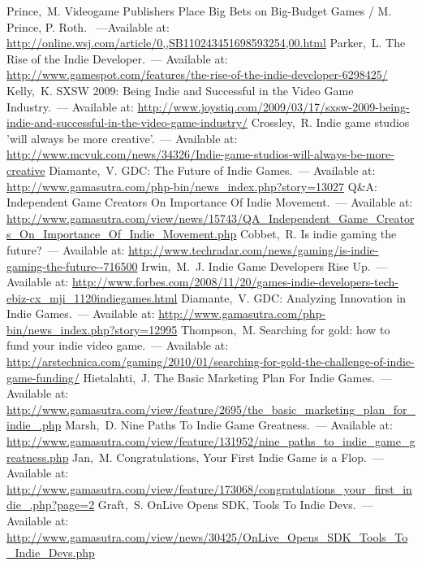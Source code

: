 \begin{thebibliography}{10}
     Prince,~M. Videogame Publishers Place Big Bets on Big-Budget Games / M. Prince, P. Roth.
        ~---Available at: \url{http://online.wsj.com/article/0,,SB110243451698593254,00.html}
     Parker,~L. The Rise of the Indie Developer.~--- Available at: 
        \url{http://www.gamespot.com/features/the-rise-of-the-indie-developer-6298425/}
     Kelly,~K. SXSW 2009: Being Indie and Successful in the Video Game Industry.~--- 
        Available at:
        \url{http://www.joystiq.com/2009/03/17/sxsw-2009-being-indie-and-successful-in-the-video-game-industry/}
     Crossley,~R. Indie game studios 'will always be more creative’.~--- Available at: 
        \url{http://www.mcvuk.com/news/34326/Indie-game-studios-will-always-be-more-creative}
     Diamante,~V. GDC: The Future of Indie Games.~--- Available at: 
        \url{http://www.gamasutra.com/php-bin/news_index.php?story=13027}
     Q\&A: Independent Game Creators On Importance Of Indie Movement.~--- Available at:
        \url{http://www.gamasutra.com/view/news/15743/QA_Independent_Game_Creators_On_Importance_Of_Indie_Movement.php}
     Cobbet,~R. Is indie gaming the future?~--- Available at:
        \url{http://www.techradar.com/news/gaming/is-indie-gaming-the-future--716500}
     Irwin,~M.~J. Indie Game Developers Rise Up.~--- Available at:
        \url{http://www.forbes.com/2008/11/20/games-indie-developers-tech-ebiz-cx_mji_1120indiegames.html}
     Diamante,~V. GDC: Analyzing Innovation in Indie Games.~--- Available at:
        \url{http://www.gamasutra.com/php-bin/news_index.php?story=12995}
     Thompson,~M. Searching for gold: how to fund your indie video game.~--- Available at:
        \url{http://arstechnica.com/gaming/2010/01/searching-for-gold-the-challenge-of-indie-game-funding/}
     Hietalahti,~J. The Basic Marketing Plan For Indie Games.~--- Available at: 
        \url{http://www.gamasutra.com/view/feature/2695/the_basic_marketing_plan_for_indie_.php}
     Marsh,~D. Nine Paths To Indie Game Greatness.~--- Available at: 
        \url{http://www.gamasutra.com/view/feature/131952/nine_paths_to_indie_game_greatness.php}
     Jan,~M. Congratulations, Your First Indie Game is a Flop.~--- Available at:
        \url{http://www.gamasutra.com/view/feature/173068/congratulations_your_first_indie_.php?page=2}
     Graft,~S. OnLive Opens SDK, Tools To Indie Devs.~--- Available at: 
        \url{http://www.gamasutra.com/view/news/30425/OnLive_Opens_SDK_Tools_To_Indie_Devs.php}

\end{thebibliography}

